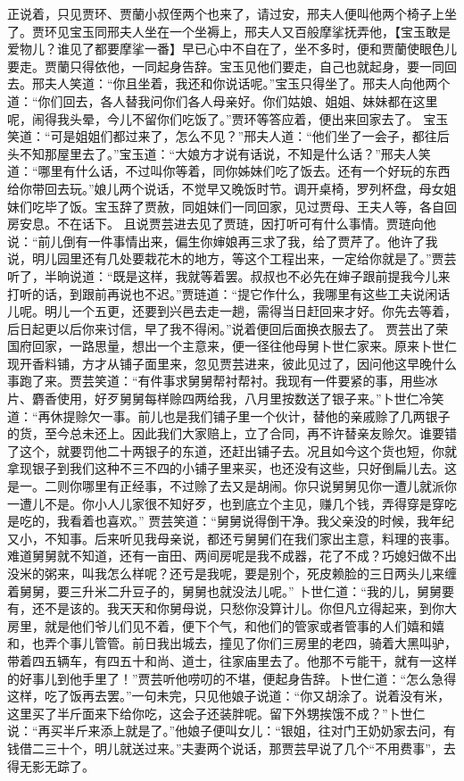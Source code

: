 \documentclass[12pt,oneside]{book}
\begin{document}
正说着，只见贾环、贾蘭小叔侄两个也来了，请过安，邢夫人便叫他两个椅子上坐了。贾环见宝玉同邢夫人坐在一个坐褥上，邢夫人又百般摩挲抚弄他，【宝玉敢是爱物儿？谁见了都要摩挲一番】早已心中不自在了，坐不多时，便和贾蘭使眼色儿要走。贾蘭只得依他，一同起身告辞。宝玉见他们要走，自己也就起身，要一同回去。邢夫人笑道：“你且坐着，我还和你说话呢。”宝玉只得坐了。邢夫人向他两个道：“你们回去，各人替我问你们各人母亲好。你们姑娘、姐姐、妹妹都在这里呢，闹得我头晕，今儿不留你们吃饭了。”贾环等答应着，便出来回家去了。
宝玉笑道：“可是姐姐们都过来了，怎么不见？”邢夫人道：“他们坐了一会子，都往后头不知那屋里去了。”宝玉道：“大娘方才说有话说，不知是什么话？”邢夫人笑道：“哪里有什么话，不过叫你等着，同你姊妹们吃了饭去。还有一个好玩的东西给你带回去玩。”娘儿两个说话，不觉早又晚饭时节。调开桌椅，罗列杯盘，母女姐妹们吃毕了饭。宝玉辞了贾赦，同姐妹们一同回家，见过贾母、王夫人等，各自回房安息。不在话下。
且说贾芸进去见了贾琏，因打听可有什么事情。贾琏向他说：“前儿倒有一件事情出来，偏生你婶娘再三求了我，给了贾芹了。他许了我说，明儿园里还有几处要栽花木的地方，等这个工程出来，一定给你就是了。”贾芸听了，半晌说道：“既是这样，我就等着罢。叔叔也不必先在婶子跟前提我今儿来打听的话，到跟前再说也不迟。”贾琏道：“提它作什么，我哪里有这些工夫说闲话儿呢。明儿一个五更，还要到兴邑去走一趟，需得当日赶回来才好。你先去等着，后日起更以后你来讨信，早了我不得闲。”说着便回后面换衣服去了。
贾芸出了荣国府回家，一路思量，想出一个主意来，便一径往他母舅卜世仁家来。原来卜世仁现开香料铺，方才从铺子面里来，忽见贾芸进来，彼此见过了，因问他这早晚什么事跑了来。贾芸笑道：“有件事求舅舅帮衬帮衬。我现有一件要紧的事，用些冰片、麝香使用，好歹舅舅每样赊四两给我，八月里按数送了银子来。”卜世仁冷笑道：“再休提赊欠一事。前儿也是我们铺子里一个伙计，替他的亲戚赊了几两银子的货，至今总未还上。因此我们大家赔上，立了合同，再不许替亲友赊欠。谁要错了这个，就要罚他二十两银子的东道，还赶出铺子去。况且如今这个货也短，你就拿现银子到我们这种不三不四的小铺子里来买，也还没有这些，只好倒扁儿去。这是一。二则你哪里有正经事，不过赊了去又是胡闹。你只说舅舅见你一遭儿就派你一遭儿不是。你小人儿家很不知好歹，也到底立个主见，赚几个钱，弄得穿是穿吃是吃的，我看着也喜欢。”
贾芸笑道：“舅舅说得倒干净。我父亲没的时候，我年纪又小，不知事。后来听见我母亲说，都还亏舅舅们在我们家出主意，料理的丧事。难道舅舅就不知道，还有一亩田、两间房呢是我不成器，花了不成？巧媳妇做不出没米的粥来，叫我怎么样呢？还亏是我呢，要是别个，死皮赖脸的三日两头儿来缠着舅舅，要三升米二升豆子的，舅舅也就没法儿呢。”
卜世仁道：“我的儿，舅舅要有，还不是该的。我天天和你舅母说，只愁你没算计儿。你但凡立得起来，到你大房里，就是他们爷儿们见不着，便下个气，和他们的管家或者管事的人们嬉和嬉和，也弄个事儿管管。前日我出城去，撞见了你们三房里的老四，骑着大黑叫驴，带着四五辆车，有四五十和尚、道士，往家庙里去了。他那不亏能干，就有一这样的好事儿到他手里了！”贾芸听他唠叨的不堪，便起身告辞。卜世仁道：“怎么急得这样，吃了饭再去罢。”一句未完，只见他娘子说道：“你又胡涂了。说着没有米，这里买了半斤面来下给你吃，这会子还装胖呢。留下外甥挨饿不成？”卜世仁说：“再买半斤来添上就是了。”他娘子便叫女儿：“银姐，往对门王奶奶家去问，有钱借二三十个，明儿就送过来。”夫妻两个说话，那贾芸早说了几个“不用费事”，去得无影无踪了。
\end{document}
